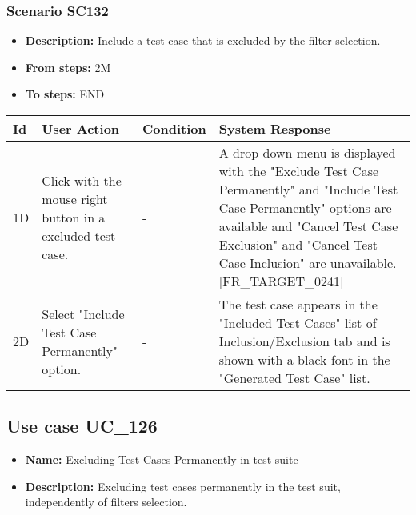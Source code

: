 \documentclass[a4paper,11pt]{article}
\newcommand{\bl}{\\ \hline}
\begin{document}
\subsubsection*{Scenario SC132}
\begin{itemize}
\item {\bf Description:} Include a test case that is excluded by the filter
					selection.
\item {\bf From steps:} 2M
\item {\bf To steps:} END
\end{itemize}
\begin{tabular}{|p{0.4in}|p{1.5in}|p{1.5in}|p{1.5in}|}
\hline
Id & User Action & Condition & System Response \bl 
1D & Click with the mouse right button in a excluded test case.
					 & - & A drop down menu is displayed with the "Exclude Test Case
						Permanently" and "Include Test Case Permanently" options are
						available and "Cancel Test Case Exclusion" and "Cancel Test Case
						Inclusion" are unavailable. [FR_TARGET_0241]\bl
2D & Select "Include Test Case Permanently" option. & - & The test case appears in the "Included Test Cases" list
						of Inclusion/Exclusion tab and is shown with a black font in the
						"Generated Test Case" list.\bl
\end{tabular}
\subsection*{Use case UC_126}
\begin{itemize}
\item {\bf Name: }Excluding Test Cases Permanently in test suite
\item {\bf Description: }Excluding test cases permanently in the test suit,
				independently of filters selection.
\end{itemize}
\end{document}
